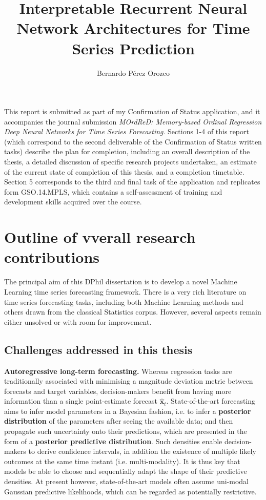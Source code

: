 \documentclass[pdftex,12pt,a4paper]{article}
\title{Interpretable Recurrent Neural Network Architectures for Time Series Prediction}
\author{Bernardo P\'erez Orozco}
\date{}
\theoremstyle{definition}
\theoremstyle{remark}
\begin{document}
\maketitle

This report is submitted as part of my Confirmation of Status application, and it accompanies the journal submission \textit{MOrdReD: Memory-based Ordinal Regression Deep Neural Networks for Time Series Forecasting}. Sections 1-4 of this report (which correspond to the second deliverable of the Confirmation of Status written tasks) describe the plan for completion, including an overall description of the thesis, a detailed discussion of specific research projects undertaken, an estimate of the current state of completion of this thesis, and a completion timetable. Section 5 corresponds to the third and final task of the application and replicates form GSO.14.MPLS, which contains a self-assessment of training and development skills acquired over the course.

\section{Outline of vverall research contributions}
The principal aim of this DPhil dissertation is to develop a novel Machine Learning time series forecasting framework. There is a very rich literature on time series forecasting tasks, including both Machine Learning methods and others drawn from the classical Statistics corpus. However, several aspects remain either unsolved or with room for improvement.

\subsection{Challenges addressed in this thesis}

\textbf{Autoregressive long-term forecasting.} Whereas regression tasks are traditionally associated with minimising a magnitude deviation metric between forecasts and target variables, decision-makers benefit from having more information than a single point-estimate forecast $\mathbf{\hat{x}}_t$. State-of-the-art forecasting aims to infer model parameters in a Bayesian fashion, i.e. to infer a \textbf{posterior distribution} of the parameters after seeing the available data; and then propagate such uncertainty onto their predictions, which are presented in the form of a \textbf{posterior predictive distribution}. Such densities enable decision-makers to derive confidence intervals, in addition the existence of multiple likely outcomes at the same time instant (i.e. multi-modality). It is thus key that models be able to choose and sequentially adapt the shape of their predictive densities. At present however, state-of-the-art models often assume uni-modal Gaussian predictive likelihoods, which can be regarded as potentially restrictive.
\end{document}
